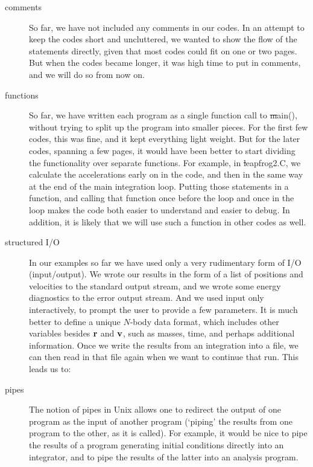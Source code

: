 \begin{description}

\item[comments]
So far, we have not included any comments in our codes.  In an attempt
to keep the codes short and uncluttered, we wanted to show the flow of
the statements directly, given that most codes could fit on one or two
pages.  But when the codes became longer, it was high time to put in
comments, and we will do so from now on.

\item[functions]
So far, we have written each program as a single function call to {\st
main()}, without trying to split up the program into smaller pieces.
For the first few codes, this was fine, and it kept everything light
weight.  But for the later codes, spanning a few pages, it would have
been better to start dividing the functionality over separate functions.
For example, in {\st leapfrog2.C}, we calculate the accelerations early
on in the code, and then in the same way at the end of the main
integration loop.  Putting those statements in a function, and calling
that function once before the loop and once in the loop makes the code
both easier to understand and easier to debug.  In addition, it is
likely that we will use such a function in other codes as well.

\item[structured I/O]
In our examples so far we have used only a very rudimentary form of
I/O (input/output).  We wrote our results in the form of a list of
positions and velocities to the standard output stream, and we wrote
some energy diagnostics to the error output stream.  And we used input
only interactively, to prompt the user to provide a few parameters.
It is much better to define a unique $N$-body data format, which
includes other variables besides ${\bf r}$ and ${\bf v}$, such as masses,
time, and perhaps additional information.  Once we write the results
from an integration into a file, we can then read in that file again
when we want to continue that run.  This leads us to:

\item[pipes]
The notion of pipes in Unix allows one to redirect the output of
one program as the input of another program (`piping' the results from
one program to the other, as it is called).  For example, it would be
nice to pipe the results of a program generating initial conditions
directly into an integrator, and to pipe the results of the latter
into an analysis program.


\end{description}
